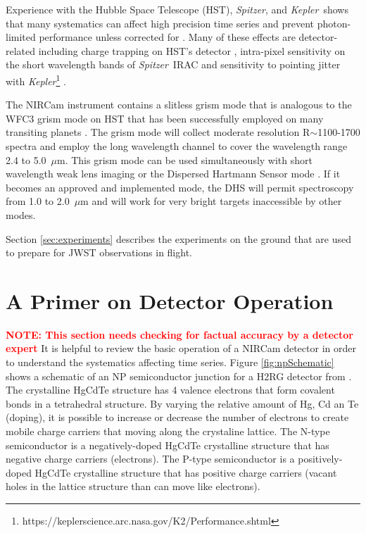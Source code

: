 \documentclass{aastex62}
\newcommand{\spitzer}{{\it Spitzer}}
\newcommand{\kepler}{{\it Kepler}}
\begin{document}
Experience with the Hubble Space Telescope (HST), \spitzer, and \kepler\ shows that many systematics can affect high precision time series and prevent photon-limited performance unless corrected for \citep[e.g.][]{beichman2014pasp}.
Many of these effects are detector-related including charge trapping on HST's detector \citep{berta2012flat_gj1214,zhou2017chargeTrap}, intra-pixel sensitivity on the short wavelength bands of \spitzer\ IRAC \citep{moralesCalderon2006LdwarfsWeatherIPC} and sensitivity to pointing jitter with \kepler\footnote{https://keplerscience.arc.nasa.gov/K2/Performance.shtml} \citep{beichman2014pasp}.

The NIRCam instrument \citep{rieke2005nircamSPIE} contains a slitless grism mode \citep{greene2017jatisNIRCam} that is analogous to the WFC3 grism mode on HST that has been successfully employed on many transiting planets \citep[e.g.]{deming13,kreidberg2014wasp43,sing2016continuum,wakeford2017hatp26}.
The grism mode will collect moderate resolution R$\sim$1100-1700 spectra and employ the long wavelength channel to cover the wavelength range 2.4 to 5.0~$\mu$m.
This grism mode can be used simultaneously with short wavelength weak lens imaging or the Dispersed Hartmann Sensor mode \citep{schlawin2017dhs}. If it becomes an approved and implemented mode, the DHS will permit spectroscopy from 1.0 to 2.0~$\mu$m and will work for very bright targets inaccessible by other modes.

Section \ref{sec:experiments} describes the experiments on the ground that are used to prepare for JWST observations in flight.


\section{A Primer on Detector Operation}
\textcolor{red}{\textbf{NOTE: This section needs checking for factual accuracy by a detector expert}}
It is helpful to review the basic operation of a NIRCam detector in order to understand the systematics affecting time series.
Figure \ref{fig:npSchematic} shows a schematic of an NP semiconductor junction for a H2RG detector from \citet{smith2008imgPersistence}.
The crystalline HgCdTe structure has 4 valence electrons that form covalent bonds in a tetrahedral structure.
By varying the relative amount of Hg, Cd an Te (doping), it is possible to increase or decrease the number of electrons to create mobile charge carriers that moving along the crystaline lattice.
The N-type semiconductor is a negatively-doped HgCdTe crystalline structure that has negative charge carriers (electrons).
The P-type semiconductor is a positively-doped HgCdTe crystalline structure that has positive charge carriers (vacant holes in the lattice structure than can move like electrons).
\end{document}
